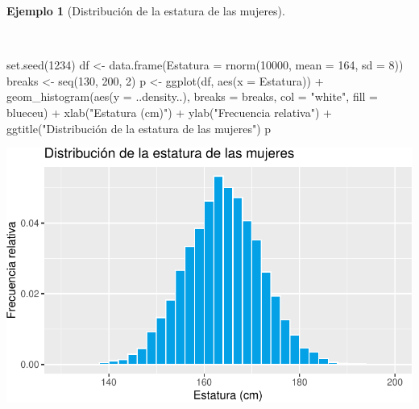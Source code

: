 \documentclass[
  a4paper,
]{scrreport}
\newenvironment{Shaded}{\begin{snugshade}}{\end{snugshade}}
\newcommand{\AttributeTok}[1]{\textcolor[rgb]{0.40,0.45,0.13}{#1}}
\newcommand{\DecValTok}[1]{\textcolor[rgb]{0.68,0.00,0.00}{#1}}
\newcommand{\FunctionTok}[1]{\textcolor[rgb]{0.28,0.35,0.67}{#1}}
\newcommand{\NormalTok}[1]{\textcolor[rgb]{0.00,0.23,0.31}{#1}}
\newcommand{\OtherTok}[1]{\textcolor[rgb]{0.00,0.23,0.31}{#1}}
\newcommand{\SpecialCharTok}[1]{\textcolor[rgb]{0.37,0.37,0.37}{#1}}
\newcommand{\StringTok}[1]{\textcolor[rgb]{0.13,0.47,0.30}{#1}}
\theoremstyle{plain}
\theoremstyle{definition}
\newtheorem{example}{Ejemplo}[chapter]
\theoremstyle{definition}
\theoremstyle{remark}
\begin{document}
\begin{example}[Distribución de la estatura de las
mujeres]\protect\hypertarget{exm-distribucion-estatura-mujeres}{}\label{exm-distribucion-estatura-mujeres}

~

\begin{Shaded}
\begin{Highlighting}[]
\FunctionTok{set.seed}\NormalTok{(}\DecValTok{1234}\NormalTok{)}
\NormalTok{df }\OtherTok{\textless{}{-}} \FunctionTok{data.frame}\NormalTok{(}\AttributeTok{Estatura =} \FunctionTok{rnorm}\NormalTok{(}\DecValTok{10000}\NormalTok{, }\AttributeTok{mean =} \DecValTok{164}\NormalTok{, }\AttributeTok{sd =} \DecValTok{8}\NormalTok{))}
\NormalTok{breaks }\OtherTok{\textless{}{-}} \FunctionTok{seq}\NormalTok{(}\DecValTok{130}\NormalTok{, }\DecValTok{200}\NormalTok{, }\DecValTok{2}\NormalTok{)}
\NormalTok{p }\OtherTok{\textless{}{-}} \FunctionTok{ggplot}\NormalTok{(df, }\FunctionTok{aes}\NormalTok{(}\AttributeTok{x =}\NormalTok{ Estatura)) }\SpecialCharTok{+}
    \FunctionTok{geom\_histogram}\NormalTok{(}\FunctionTok{aes}\NormalTok{(}\AttributeTok{y =}\NormalTok{ ..density..), }\AttributeTok{breaks =}\NormalTok{ breaks, }\AttributeTok{col =} \StringTok{"white"}\NormalTok{, }\AttributeTok{fill =}\NormalTok{ blueceu) }\SpecialCharTok{+}
    \FunctionTok{xlab}\NormalTok{(}\StringTok{"Estatura (cm)"}\NormalTok{) }\SpecialCharTok{+}
    \FunctionTok{ylab}\NormalTok{(}\StringTok{"Frecuencia relativa"}\NormalTok{) }\SpecialCharTok{+}
    \FunctionTok{ggtitle}\NormalTok{(}\StringTok{"Distribución de la estatura de las mujeres"}\NormalTok{)}
\NormalTok{p}
\end{Highlighting}
\end{Shaded}

\includegraphics{02-estadistica-descriptiva_files/figure-pdf/histograma-estatura-mujeres-1.pdf}

\end{example}
\end{document}
